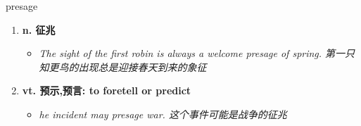 
\begin{frame}
{\huge presage}
\begin{center}
\begin{enumerate}\Large
  \item \textbf{n. 征兆}
  \begin{itemize}
    \item \em{\Large{The sight of the first robin is always a welcome presage of spring. 第一只知更鸟的出现总是迎接春天到来的象征}}
  \end{itemize}
  \item \textbf{vt. 预示,预言: to foretell or predict}
  \begin{itemize}
    \item \em{\Large{he incident may presage war. 这个事件可能是战争的征兆}}
  \end{itemize}
\end{enumerate}
\end{center}
\end{frame}
